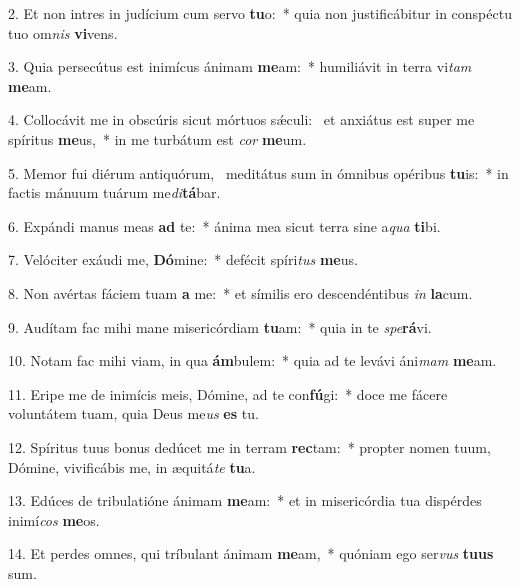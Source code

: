 2. Et non intres in judícium cum servo \textbf{tu}o:~*  quia non justificábitur in conspéctu tuo om\textit{nis} \textbf{vi}vens.\

3. Quia persecútus est inimícus ánimam \textbf{me}am:~*  humiliávit in terra vi\textit{tam} \textbf{me}am.\

4. Collocávit me in obscúris sicut mórtuos sǽculi: \dag\  et anxiátus est super me spíritus \textbf{me}us,~*  in me turbátum est \textit{cor} \textbf{me}um.\

5. Memor fui diérum antiquórum, \dag\  meditátus sum in ómnibus opéribus \textbf{tu}is:~*  in factis mánuum tuárum me\textit{di}\textbf{tá}bar.\

6. Expándi manus meas \textbf{ad} te:~*  ánima mea sicut terra sine a\textit{qua} \textbf{ti}bi.\

7. Velóciter exáudi me, \textbf{Dó}mine:~*  defécit spíri\textit{tus} \textbf{me}us.\

8. Non avértas fáciem tuam \textbf{a} me:~*  et símilis ero descendéntibus \textit{in} \textbf{la}cum.\

9. Audítam fac mihi mane misericórdiam \textbf{tu}am:~*  quia in te \textit{spe}\textbf{rá}vi.\

10. Notam fac mihi viam, in qua \textbf{ám}bulem:~*  quia ad te levávi áni\textit{mam} \textbf{me}am.\

11. Eripe me de inimícis meis, Dómine, ad te con\textbf{fú}gi:~*  doce me fácere voluntátem tuam, quia Deus me\textit{us} \textbf{es} tu.\

12. Spíritus tuus bonus dedúcet me in terram \textbf{rec}tam:~*  propter nomen tuum, Dómine, vivificábis me, in æquitá\textit{te} \textbf{tu}a.\

13. Edúces de tribulatióne ánimam \textbf{me}am:~*  et in misericórdia tua dispérdes inimí\textit{cos} \textbf{me}os.\

14. Et perdes omnes, qui tríbulant ánimam \textbf{me}am,~*  quóniam ego ser\textit{vus} \textbf{tu}\textbf{us} sum.\

